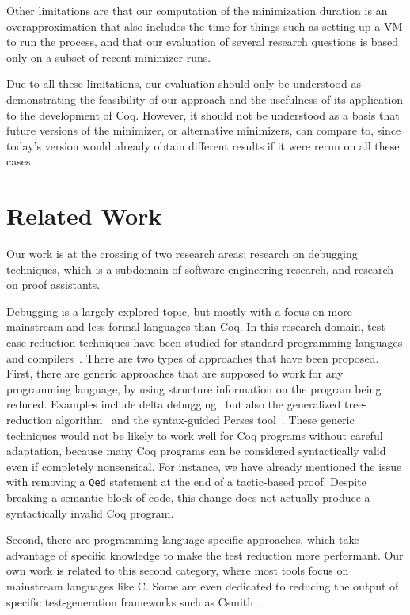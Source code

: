 \documentclass[a4paper,USenglish,cleveref,autoref,thm-restate]{lipics-v2021}
\begin{document}
Other limitations are that our computation of the minimization duration is an overapproximation that also includes the time for things such as setting up a VM to run the process, and that our evaluation of several research questions is based only on a subset of recent minimizer runs.

Due to all these limitations, our evaluation should only be understood as demonstrating the feasibility of our approach and the usefulness of its application to the development of Coq. However, it should not be understood as a basis that future versions of the minimizer, or alternative minimizers, can compare to, since today's version would already obtain different results if it were rerun on all these cases.

\section{Related Work}\label{sec:related-work}

Our work is at the crossing of two research areas: research on debugging techniques, which is a subdomain of software-engineering research, and research on proof assistants.

Debugging is a largely explored topic, but mostly with a focus on more mainstream and less formal languages than Coq.
In this research domain, test-case-reduction techniques have been studied for standard programming languages and compilers~\cite{chen_survey_compiler_testing}. There are two types of approaches that have been proposed. First, there are generic approaches that are supposed to work for any programming language, by using structure information on the program being reduced. Examples include delta debugging~\cite{Zeller2002} but also the generalized tree-reduction algorithm~\cite{herfert2017automatically} and the syntax-guided Perses tool~\cite{herfert2017automatically}. These generic techniques would not be likely to work well for Coq programs without careful adaptation, because many Coq programs can be considered syntactically valid even if completely nonsensical. For instance, we have already mentioned the issue with removing a \texttt{Qed} statement at the end of a tactic-based proof. Despite breaking a semantic block of code, this change does not actually produce a syntactically invalid Coq program.

Second, there are programming-language-specific approaches, which take advantage of specific knowledge to make the test reduction more performant. Our own work is related to this second category, where most tools focus on mainstream languages like C. Some are even dedicated to reducing the output of specific test-generation frameworks such as Csmith~\cite{regehr2012test}.
\end{document}
